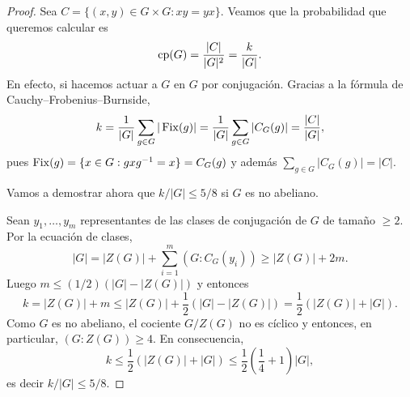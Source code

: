 \begin{proof}
    Sea $C=\{(x,y)\in G\times G:xy=yx\}$. Veamos que la probabilidad que queremos calcular 
    es
    \[
    \operatorname{cp}(G)=\frac{|C|}{|G|^2}=\frac{k}{|G|}.
    \]
    En efecto, si hacemos actuar a $G$ en $G$ por conjugación. Gracias a 
    la fórmula de Cauchy--Frobenius--Burnside, 
    \[
    k=\frac{1}{|G|}\sum_{g\in G}|\operatorname{Fix}(g)|=\frac{1}{|G|}\sum_{g\in G}|C_G(g)|=\frac{|C|}{|G|},
    \]
    pues $\operatorname{Fix}(g)=\{x\in G:gxg^{-1}=x\}=C_G(g)$ y además $\sum_{g\in G}|C_G(g)|=|C|$. 

    Vamos a demostrar ahora que $k/|G|\leq 5/8$ si $G$ es no abeliano. 
   
    Sean $y_1,\dots,y_m$ representantes de las clases de conjugación de $G$ de tamaño $\geq2$. Por 
    la ecuación de clases, 
    \[
    |G|=|Z(G)|+\sum_{i=1}^m(G:C_G(y_i))\geq |Z(G)|+2m.
    \]
    Luego $m\leq(1/2)(|G|-|Z(G)|)$ y entonces
    \[
    k=|Z(G)|+m\leq |Z(G)|+\frac12(|G|-|Z(G)|)=\frac12(|Z(G)|+|G|).
    \]
    Como $G$ es no abeliano, el cociente $G/Z(G)$ no es 
    cíclico y entonces, en particular, $(G:Z(G))\geq4$. En consecuencia, 
    \[
    k\leq\frac12(|Z(G)|+|G|)\leq\frac12\left(\frac14+1\right)|G|,
    \]
    es decir $k/|G|\leq 5/8$. 
\end{proof}

    
    
    

